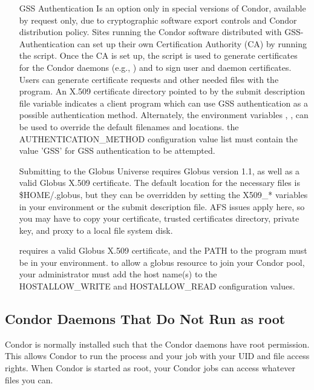\begin{enumerate}
\item[GSS Authentication] Is an option only in special versions of Condor,
available by request only, due to cryptographic software export controls
and Condor distribution policy.
Sites running the Condor software distributed with GSS-Authentication can 
set up their own Certification Authority (CA) by running the 
 script. 
Once the CA is set up, the  script is used to generate 
certificates for the Condor daemons (e.g., ) and to sign
user and daemon certificates. Users can generate certificate requests
and other needed files with the  program.
An X.509 certificate directory pointed to by the submit description file 
variable  indicates a client program which can use GSS
authentication as a possible authentication method. Alternately, the
environment variables , ,
 can be used to override the default filenames and 
locations.
\Note the AUTHENTICATION\_METHOD configuration value list must contain 
the value 'GSS' for GSS authentication to be attempted.

\item[Submitting to the Globus Universe] 
requires Globus version 1.1, as well as a valid Globus X.509 certificate. 
The default location for the necessary files is \$HOME/.globus, but they 
can be overridden by setting the X509\_* variables in your environment 
or the submit description file.
\Note AFS issues apply here, so you may have to copy your certificate,
trusted certificates directory, private key, and proxy to a local
file system disk.

\item[\Condor{glidein}]  requires a valid 
Globus X.509 certificate, and the PATH to the  program 
must be in your environment.
\Note to allow a globus resource to join your Condor pool, your 
administrator must add the host name(s) to the HOSTALLOW\_WRITE and
HOSTALLOW\_READ configuration values.
\end{enumerate}

\subsection{Condor Daemons That Do Not Run as root}

Condor is normally installed such that the Condor daemons have root
permission.
This allows Condor to run the  
process and
your job with your UID and file access rights.
When Condor
is started as root, your Condor jobs can access whatever files you can.

